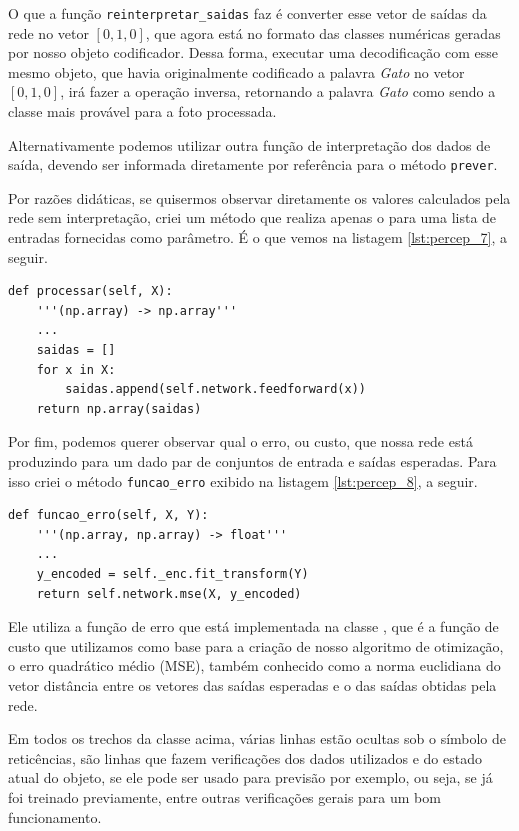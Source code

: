 O que a função \texttt{reinterpretar\_saidas} faz é converter esse vetor de saídas da rede no vetor $[0, 1, 0]$, que agora está no formato das classes numéricas geradas por nosso objeto codificador. Dessa forma, executar uma decodificação com esse mesmo objeto, que havia originalmente codificado a palavra \emph{Gato} no vetor $[0, 1, 0]$, irá fazer a operação inversa, retornando a palavra \emph{Gato} como sendo a classe mais provável para a foto processada.

Alternativamente podemos utilizar outra função de interpretação dos dados de saída, devendo ser informada diretamente por referência para o método \texttt{prever}.

Por razões didáticas, se quisermos observar diretamente os valores calculados pela rede sem interpretação, criei um método que realiza apenas o  para uma lista de entradas fornecidas como parâmetro. É o que vemos na listagem \ref{lst:percep_7}, a seguir.
\newline
\estiloR
\begin{lstlisting}[caption={Trecho da classe \eng{Perceptron}}, label={lst:percep_7}, escapeinside={\%}]
def processar(self, X):
    '''(np.array) -> np.array'''
    ...
    saidas = []
    for x in X:
        saidas.append(self.network.feedforward(x))
    return np.array(saidas)
\end{lstlisting}


Por fim, podemos querer observar qual o erro, ou custo, que nossa rede está produzindo para um dado par de conjuntos de entrada e saídas esperadas. Para isso criei o método \texttt{funcao\_erro} exibido na listagem \ref{lst:percep_8}, a seguir. 
\newline
\estiloR
\begin{lstlisting}[caption={Trecho da classe \eng{Perceptron}}, label={lst:percep_8}, escapeinside={\%}]
def funcao_erro(self, X, Y):
    '''(np.array, np.array) -> float'''
    ...
    y_encoded = self._enc.fit_transform(Y)
    return self.network.mse(X, y_encoded)
\end{lstlisting}


Ele utiliza a função de erro que está implementada na classe , que é a função de custo que utilizamos como base para a criação de nosso algoritmo de otimização, o erro quadrático médio (MSE), também conhecido como a norma euclidiana do vetor distância entre os vetores das saídas esperadas e o das saídas obtidas pela rede.

Em todos os trechos da classe  acima, várias linhas estão ocultas sob o símbolo de reticências, são linhas que fazem verificações dos dados utilizados e do estado atual do objeto, se ele pode ser usado para previsão por exemplo, ou seja, se já foi treinado previamente, entre outras verificações gerais para um bom funcionamento.

